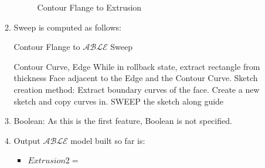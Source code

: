 \begin{enumerate}
\begin{enumerate}
		  \begin{minipage}{\linewidth}
		  \begin{figure}[H]
		\centering 
		\caption{Contour Flange to Extrusion}
		\label{fig_cf2ext2}
		\end{figure}
		\end{minipage}	



		  
			
	\item	Sweep    is computed as follows:	
		
\bigskip
		  \begin{minipage}{\linewidth}
		  \begin{algorithm}[H]
			\caption{Contour Flange to $\mathcal{ABLE}$ Sweep}
			\label{alg:absraction:transformsweep}
			\begin{algorithmic}[1]
					\REQUIRE Contour Curve, Edge
					\STATE  While in rollback state, extract rectangle from thickness Face adjacent to the Edge and the Contour Curve.
					\STATE  Sketch creation method:  Extract boundary curves of the face. Create a new sketch and copy curves in.			
					\STATE  SWEEP the sketch along guide
				\end{algorithmic}
		\end{algorithm}	
		  \end{minipage}				
\bigskip	
	     
	\item Boolean: As this is the first feature, Boolean is not specified.
	\item Output  $\mathcal{ABLE}$ model built so far is:
		\begin{itemize}[noitemsep,topsep=2pt,parsep=2pt,partopsep=2pt,label={+}]
		\item  $Extrusion2 =$ 
		\end{itemize}
	\end{enumerate}


\end{enumerate}
